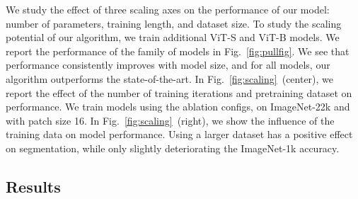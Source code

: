 We study the effect of three scaling axes on the performance of our model: number of parameters, training length, and dataset size.
To study the scaling potential of our algorithm, we train additional ViT-S and ViT-B models.
We report the performance of the family of models in Fig.~\ref{fig:pullfig}.
We see that performance consistently improves with model size, and for all models, our algorithm outperforms the state-of-the-art.
In Fig.~\ref{fig:scaling}~(center), we report the effect of the number of training iterations and pretraining dataset on performance.
We train models using the ablation configs, on ImageNet-22k and with patch size 16.
In Fig.~\ref{fig:scaling}~(right), we show the influence of the training data on model performance.
Using a larger dataset has a positive effect on segmentation, while only slightly deteriorating the ImageNet-1k accuracy.

\subsection{Results}



